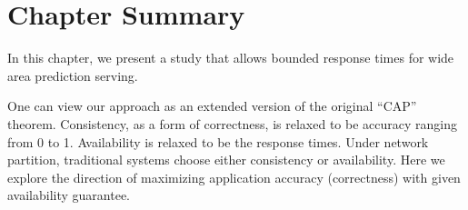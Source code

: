 \section{Chapter Summary}
\label{sec:chap-summary}

In this chapter, we present a study that allows bounded response times for wide
area prediction serving.

One can view our approach as an extended version of the original ``CAP''
theorem. Consistency, as a form of correctness, is relaxed to be accuracy
ranging from 0 to 1. Availability is relaxed to be the response times. Under
network partition, traditional systems choose either consistency or
availability. Here we explore the direction of maximizing application accuracy
(correctness) with given availability guarantee.

